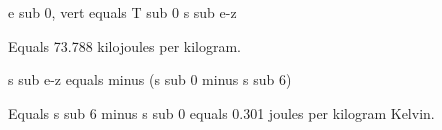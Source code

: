 e sub 0, vert equals T sub 0 s sub e-z  

Equals 73.788 kilojoules per kilogram.  

s sub e-z equals minus (s sub 0 minus s sub 6)  

Equals s sub 6 minus s sub 0 equals 0.301 joules per kilogram Kelvin.